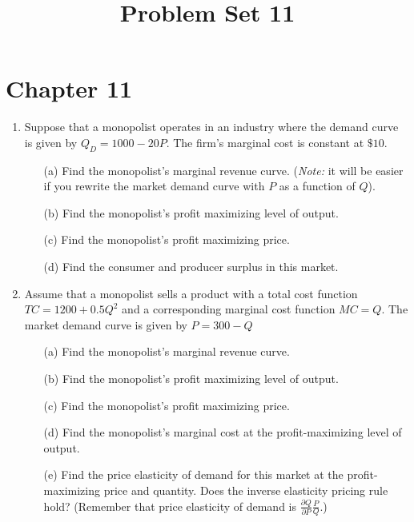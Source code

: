 \documentclass[11pt]{article}
\title{Problem Set 11}
\begin{document}
 
  
\section*{Chapter 11}

\begin{enumerate}
  \item Suppose that a monopolist operates in an industry where the demand curve is given by $Q_D = 1000 - 20P$. The firm's marginal cost is constant at $\$ 10$.
  \begin{enumerate}
    \item[(a)] Find the monopolist's marginal revenue curve. (\emph{Note:} it will be easier if you rewrite the market demand curve with $P$ as a function of $Q$).

    \item[(b)] Find the monopolist's profit maximizing level of output.

    \item[(c)] Find the monopolist's profit maximizing price.

    \item[(d)] Find the consumer and producer surplus in this market.
  \end{enumerate}

  \item Assume that a monopolist sells a product with a total cost function $TC = 1200 + 0.5 Q^2$ and a corresponding marginal cost function $MC = Q$. The market demand curve is given by $P = 300 - Q$

  \begin{enumerate}
    \item[(a)] Find the monopolist's marginal revenue curve.

    \item[(b)] Find the monopolist's profit maximizing level of output.

    \item[(c)] Find the monopolist's profit maximizing price.

    \item[(d)] Find the monopolist's marginal cost at the profit-maximizing level of output.

    \item[(e)] Find the price elasticity of demand for this market at the profit-maximizing price and quantity. Does the inverse elasticity pricing rule hold? (Remember that price elasticity of demand is $\frac{\partial Q}{\partial P} \frac{P}{Q}$.)
  \end{enumerate}



\end{enumerate}
\end{document}

